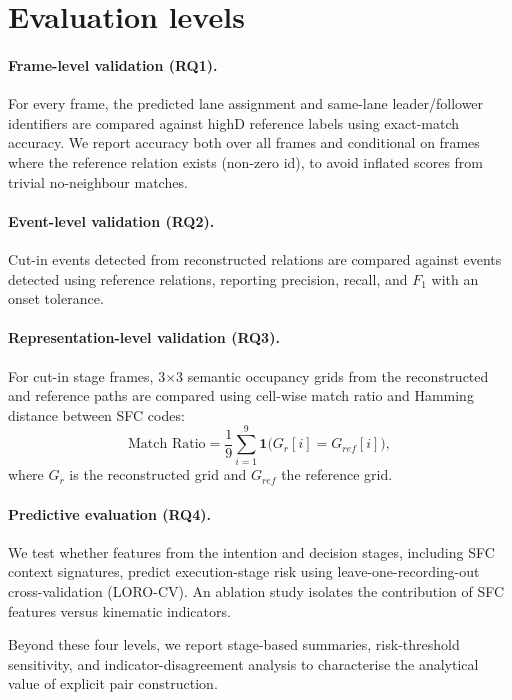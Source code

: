 \documentclass[12pt,a4paper,twoside,openright]{report}
\begin{document}
    \section{Evaluation levels}

    \paragraph{Frame-level validation (RQ1).}
    For every frame, the predicted lane assignment and same-lane leader/follower identifiers are compared against highD reference labels using exact-match accuracy. We report accuracy both over all frames and conditional on frames where the reference relation exists (non-zero id), to avoid inflated scores from trivial no-neighbour matches.

    \paragraph{Event-level validation (RQ2).}
    Cut-in events detected from reconstructed relations are compared against events detected using reference relations, reporting precision, recall, and $F_1$ with an onset tolerance.

    \paragraph{Representation-level validation (RQ3).}
    For cut-in stage frames, 3$\times$3 semantic occupancy grids from the reconstructed and reference paths are compared using cell-wise match ratio and Hamming distance between SFC codes:
    \[
        \text{Match Ratio}=\frac{1}{9}\sum_{i=1}^{9}\mathbf{1}\big(G_r[i]=G_{ref}[i]\big),
    \]
    where $G_r$ is the reconstructed grid and $G_{ref}$ the reference grid.

    \paragraph{Predictive evaluation (RQ4).}
    We test whether features from the intention and decision stages, including SFC context signatures, predict execution-stage risk using leave-one-recording-out cross-validation (LORO-CV). An ablation study isolates the contribution of SFC features versus kinematic indicators.

    Beyond these four levels, we report stage-based summaries, risk-threshold sensitivity, and indicator-disagreement analysis to characterise the analytical value of explicit pair construction.
\end{document}
